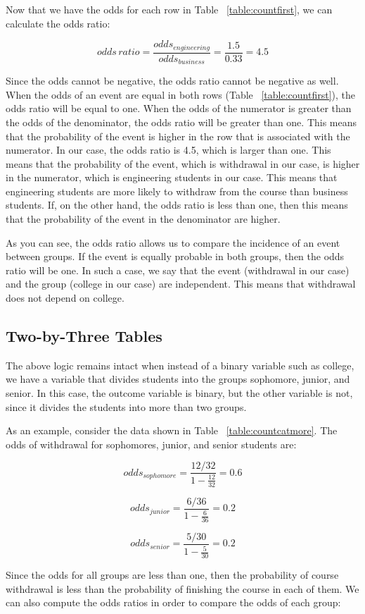 \documentclass[a4paper,12pt,oneside]{book}
\begin{document}
Now that we have the odds for each row in Table ~\ref{table:countfirst}, we can calculate the odds ratio:

$$ odds\, ratio = \frac{odds_{engineering}}{odds_{business}}=\frac{1.5}{0.33}=4.5 $$

Since the odds cannot be negative, the odds ratio cannot be negative as well. When the odds of an event are equal in both rows (Table ~\ref{table:countfirst}), the odds ratio will be equal to one. When the odds of the numerator is greater 
than the odds of the denominator, the odds ratio will be greater than one. This means that the probability of the event is higher in the row that is associated with the numerator. In our case, the odds ratio is 4.5, 
which is larger than one. This means that the probability of the event, which is withdrawal in our case, is higher in the numerator, which is engineering students in our case. This means that engineering students are more likely to withdraw 
from the course than business students. If, on the other hand, the odds ratio is less than one, then this means that the probability of the event in the denominator are higher.

As you can see, the odds ratio allows us to compare the incidence of an event between groups. If the event is equally probable in both groups, then the odds ratio will be one. In such a case, we say that 
the event (withdrawal in our case) and the group (college in our case) are independent. This means that withdrawal does not depend on college.
\subsection{Two-by-Three Tables}
The above logic remains intact when instead of a binary variable such as college, we have a variable that divides students into the groups sophomore, junior, and senior. In this case, the outcome variable is binary, 
but the other variable is not, since it divides the students into more than two groups.

As an example, consider the data shown in Table ~\ref{table:countcatmore}. The odds of withdrawal for sophomores, junior, and senior students are:

$$ odds_{sophomore}=\frac{12/32}{1-\frac{12}{32}}=0.6 $$

$$ odds_{junior}=\frac{6/36}{1-\frac{6}{36}}=0.2 $$

$$ odds_{senior}=\frac{5/30}{1-\frac{5}{30}}=0.2 $$

Since the odds for all groups are less than one, then the probability of course withdrawal is less than the probability of finishing the course in each of them. We can also compute the odds ratios in order to compare 
the odds of each group:
\end{document}
